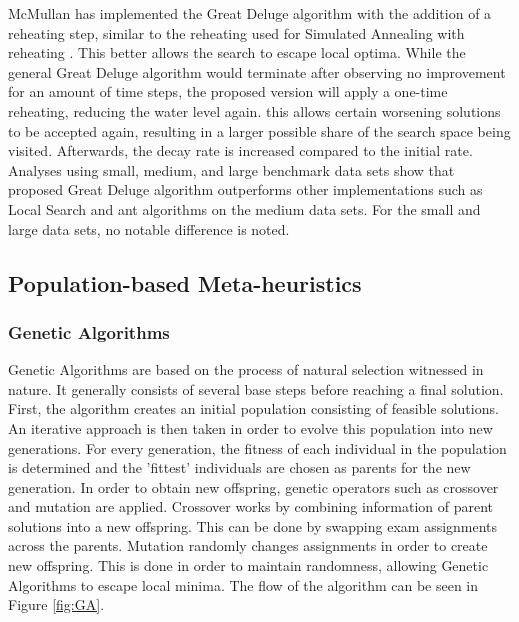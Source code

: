 McMullan \cite{mcmullan2007} has implemented the Great Deluge algorithm with the addition of a reheating step, similar to the reheating used for Simulated Annealing with reheating \cite{Goh2017}. This better allows the search to escape local optima. While the general Great Deluge algorithm would terminate after observing no improvement for an amount of time steps, the proposed version will apply a one-time reheating, reducing the water level again. this allows certain worsening solutions to be accepted again, resulting in a larger possible share of the search space being visited. Afterwards, the decay rate is increased compared to the initial rate. Analyses using small, medium, and large benchmark data sets show that proposed Great Deluge algorithm outperforms other implementations such as Local Search and ant algorithms on the medium data sets. For the small and large data sets, no notable difference is noted.

\subsection{Population-based Meta-heuristics}

\subsubsection{Genetic Algorithms}

Genetic Algorithms \cite{Holland1975} are based on the process of natural selection witnessed in nature. It generally consists of several base steps before reaching a final solution. First, the algorithm creates an initial population consisting of feasible solutions. An iterative approach is then taken in order to evolve this population into new generations. For every generation, the fitness of each individual in the population is determined and the 'fittest' individuals are chosen as parents for the new generation. In order to obtain new offspring, genetic operators such as crossover and mutation are applied. Crossover works by combining information of parent solutions into a new offspring. This can be done by swapping exam assignments across the parents. Mutation randomly changes assignments in order to create new offspring. This is done in order to maintain randomness, allowing Genetic Algorithms to escape local minima. The flow of the algorithm can be seen in Figure \ref{fig:GA}.

